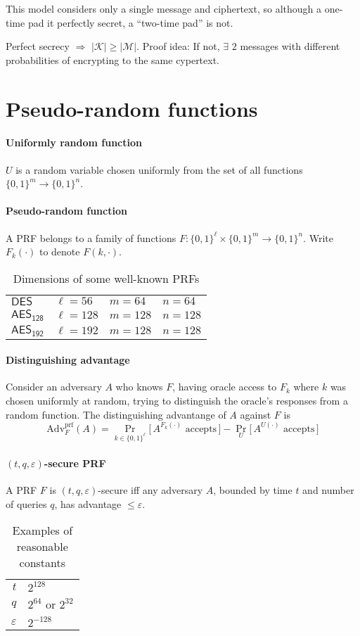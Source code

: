 \documentclass[11pt]{article}
\begin{document}
This model considers only a single message and ciphertext,
so although a one-time pad it perfectly secret, a ``two-time pad'' is not.

Perfect secrecy $\Rightarrow$ $|\mathcal{K}| \ge |\mathcal{M}|$.
Proof idea: If not, $\exists$ $2$ messages with different probabilities
of encrypting to the same cypertext.

\section{Pseudo-random functions}

\paragraph{Uniformly random function}
$U$ is a random variable chosen uniformly from the set of all functions
$\{0,1\}^m \rightarrow \{0,1\}^n$.

\paragraph{Pseudo-random function}
A PRF belongs to a family of functions
$F : \{0,1\}^\ell \times \{0,1\}^m \rightarrow \{0,1\}^n$.
Write $F_k(\cdot)$ to denote $F(k, \cdot)$.

\begin{SCtable}[2.5][h]
\caption*{Dimensions of some well-known PRFs}
\begin{tabular}{l|lll}
$\mathsf{DES}$ & $\ell = 56$ & $m = 64$ & $n = 64$ \\
$\mathsf{AES_{128}}$ & $\ell = 128$ & $m = 128$ & $n = 128$ \\
$\mathsf{AES_{192}}$ & $\ell = 192$ & $m = 128$ & $n = 128$
\end{tabular}
\end{SCtable}

\paragraph{Distinguishing advantage}
Consider an adversary $A$ who knows $F$, having oracle access
to $F_k$ where $k$ was chosen uniformly at random, trying to
distinguish the oracle's responses from a random function.
The distinguishing advantange of $A$ against $F$ is
\[ \textrm{Adv}_F^\textrm{prf} (A) = 
\Pr_{k\in\{0,1\}^\ell} \big[ \, A^{F_k(\cdot)} \textrm{ accepts} \, \big]
- \Pr_U \big[ \, A^{U(\cdot)} \textrm{ accepts} \, \big] \]

\paragraph{$(t,q,\varepsilon)$-secure PRF}
A PRF $F$ is $(t,q,\varepsilon)$-secure iff any adversary $A$,
bounded by time $t$ and number of queries $q$,
has advantage $\le \varepsilon$.

\begin{SCtable}[2.5][h]
\caption*{Examples of reasonable constants}
\begin{tabular}{r|l}
$t$ & $2^{128}$ \\
$q$ & $2^{64}$ or $2^{32}$ \\
$\varepsilon$ & $2^{-128}$
\end{tabular}
\end{SCtable}
\end{document}

